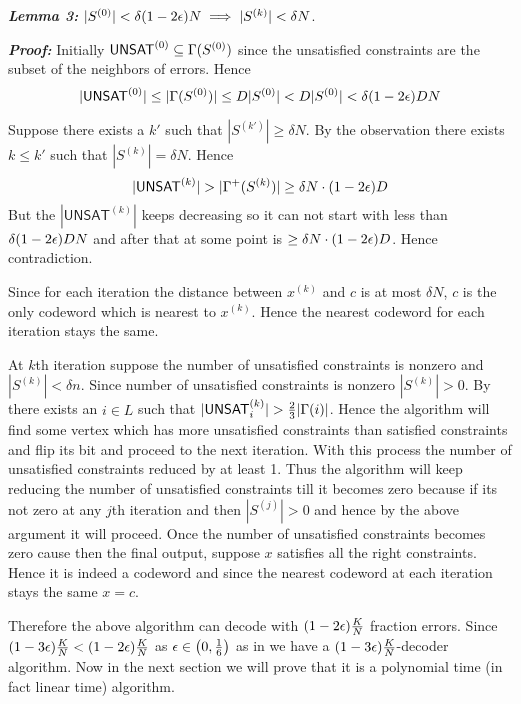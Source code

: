 \documentclass[a4paper, 11pt]{article}
\begin{document}
{\begin{enumerate}
\parinf	

\textbf{\textit{Lemma 3:}}\label{exdecodelem2} $|S^{(0)}|<\delta(1-2\epsilon)N\implies |S^{(k)}|<\delta N$.


\textbf{\textit{Proof:}} \parinn Initially $\mathsf{UNSAT}^{(0)}\subseteq {\Gamma(S^{(0)})}$ since the unsatisfied constraints are the subset of the neighbors of errors. Hence $$|\mathsf{UNSAT}^{(0)}|\leq|{\Gamma(S^{(0)})}|\leq D|S^{(0)}|<D|S^{(0)}|<\delta(1-2\epsilon)DN$$
	
Suppose there exists a $k'$ such that $|S^{(k')}|\geq \delta N$. By the observation there exists $k\leq k'$ such that $|S^{(k)}|=\delta N$. Hence $$|\mathsf{UNSAT}^{(k)}|>|\Gm^+(S^{(k)})|\geq \delta N\cdot (1-2\eps)D$$But the $|\mathsf{UNSAT}^{(k)}|$ keeps decreasing so it can not start with less than $\delta(1-2\epsilon)DN$ and after that at some point is $\geq \delta N\cdot (1-2\epsilon)D$. Hence contradiction. \Qed

Since for each iteration the distance between $x^{(k)}$ and $c$ is at most $\delta N$, $c$ is the only codeword which is nearest to $x^{(k)}$. Hence the nearest codeword for each iteration stays the same.

At $k$th iteration  suppose the  number of unsatisfied constraints is nonzero and $|S^{(k)}|<\delta n$. Since number of  unsatisfied constraints is nonzero $|S^{(k)}|> 0$. By   there exists an $i\in L$ such that $|\mathsf{UNSAT}_i^{(k)}|>\frac23|\Gm(i)|$. Hence the algorithm will find some vertex which has more unsatisfied constraints than satisfied constraints and flip its bit and proceed to the next iteration. With this process the number of unsatisfied constraints reduced by at least 1. Thus the algorithm will keep reducing the number of unsatisfied constraints till it becomes zero because if its not zero at any $j$th iteration and then $|S^{(j)}|>0$ and hence by the above argument it will proceed. Once the  number of unsatisfied constraints becomes zero cause then the final output, suppose $x$ satisfies all the right constraints. Hence it is indeed a codeword and since the nearest codeword at each iteration stays the same $x=c$. 

Therefore the above algorithm can decode with $(1-2\epsilon)\frac{K}{N}$ fraction errors. Since $(1-3\epsilon)\frac{K}{N}< (1-2\epsilon)\frac{K}{N}$ as $\epsilon\in\left(0,\frac16\right)$ as in  we have a $(1-3\epsilon)\frac{K}{N}$-decoder algorithm. Now in the next section we will prove that it is a polynomial time (in fact linear time) algorithm.


\end{enumerate}}
\end{document}
